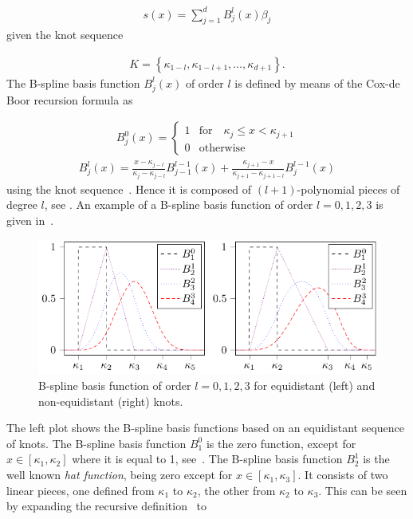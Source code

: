 \begin{align}
	s(x) = \sum_{j=1}^d B_j^l(x) \beta_j 
\end{align}
%
given the knot sequence 

\begin{align} \label{eq:knot-sequence}
	K = \left\{\kappa_{1-l}, \kappa_{1-l+1}, \dots, \kappa_{d+1}\right\}.
\end{align}
%
The B-spline basis function $B_j^l(x)$ of order $l$ is defined by means of the Cox-de Boor recursion formula as

\begin{align} \label{eq:Bspline_recDef1}
	B_j^0(x) = \begin{cases} 1 & \text{for} \quad \kappa_j \le x < \kappa_{j+1} \\ 
					 		 0 & \text{otherwise} 
	\end{cases}
\end{align}
\begin{align} \label{eq:Bspline_recDef2}
	B_j^l(x) = \frac{x - \kappa_{j-l}}{\kappa_{j} - \kappa_{j-l}} B_{j-1}^{l-1}(x) + \frac{\kappa_{j+1} - x}{\kappa_{j+1} - \kappa_{j+1-l}} B_{j}^{l-1}(x)
\end{align}
%
using the knot sequence~. Hence it is composed of $(l+1)$-polynomial pieces of degree $l$, see \cite{fahrmeir2007regression}. An example of a B-spline basis function of order $l=0, 1, 2, 3$ is given in~. 

\begin{figure}[H]
	\centering
	\includegraphics{graphics/pgfplots/cha2/spline-types.pdf}
	\caption{B-spline basis function of order $l=0, 1, 2, 3$ for equidistant (left) and non-equidistant (right) knots.}
	\label{fig:spline-types-both}
\end{figure}

The left plot shows the B-spline basis functions based on an equidistant sequence of knots. The B-spline basis function $B_1^0$ is the zero function, except for $x \in [\kappa_1, \kappa_2]$ where it is equal to 1, see~. The B-spline basis function $B_2^1$ is the well known \emph{hat function}, being zero except for $x \in [\kappa_1, \kappa_3]$. It consists of two linear pieces, one defined from $\kappa_1$ to $\kappa_2$, the other from $\kappa_2$ to $\kappa_3$. This can be seen by expanding the recursive definition~ to

